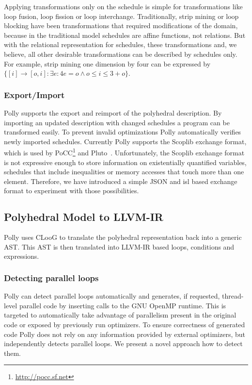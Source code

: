 \documentclass{acm_proc_article-sp}
\begin{document}
Applying transformations only on the schedule is simple for transformations
like loop fusion, loop fission or loop interchange. Traditionally, strip mining
or loop blocking have been transformations that required modifications of
the domain, because in the traditional model schedules are affine functions, not
relations. But with the relational representation for schedules, these
transformations and, we believe, all other desirable transformations can be
described by schedules only. For example, strip mining one dimension by four
can be expressed by
$\{[i] \rightarrow [o, i] : \exists e : 4e = o \land o \le i \le 3 + o\}$.

\subsubsection{Export/Import}

Polly supports the export and reimport of the polyhedral description.  By
importing an updated description with changed schedules a program can be
transformed easily. To prevent invalid optimizations Polly automatically verifies
newly imported schedules. 
Currently Polly supports the Scoplib exchange format, which is used by
PoCC\footnote{\url{http://pocc.sf.net}} and Pluto~\cite{uday08pldi}.
Unfortunately, the Scoplib exchange format is not expressive enough to store
information on existentially quantified variables, schedules that include
inequalities or memory accesses that touch more than one element. Therefore, we
have introduced a simple JSON\cite{rfc4627} and isl based exchange format to
experiment with those possibilities.

\subsection{Polyhedral Model to LLVM-IR}
Polly uses CLooG \cite{Bas04b} to translate the polyhedral representation back
into a generic AST. This AST is then
translated into LLVM-IR based loops, conditions and expressions.

\subsubsection{Detecting parallel loops}
Polly can detect parallel loops automatically and generates, if requested,
thread-level parallel code by inserting calls to the GNU OpenMP runtime. This
is targeted to automatically take advantage of parallelism present in the
original code or exposed by previously run optimizers. To ensure correctness of
generated code Polly does not rely on any information provided by external
optimizers, but independently detects parallel loops. We present a novel
approach how to detect them.
\end{document}
